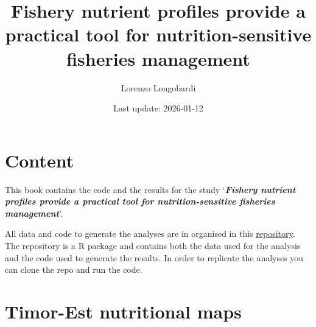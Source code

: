 \documentclass[
]{book}
\title{Fishery nutrient profiles provide a practical tool for nutrition-sensitive fisheries management}
\author{Lorenzo Longobardi}
\date{Last update: 2026-01-12}
\begin{document}
\maketitle

{
\setcounter{tocdepth}{1}
\tableofcontents
}
\chapter{Content}\label{content}

This book contains the code and the results for the study `\textbf{\emph{Fishery nutrient profiles provide a practical tool for nutrition-sensitive fisheries management}}'.

All data and code to generate the analyses are in organised in this \href{https://github.com/WorldFishCenter/timor.nutrients}{repository}. The repository is a R package and contains both the data used for the analysis and the code used to generate the results. In order to replicate the analyses you can clone the repo and run the code.

\chapter{Timor-Est nutritional maps}\label{highlight}
\end{document}
